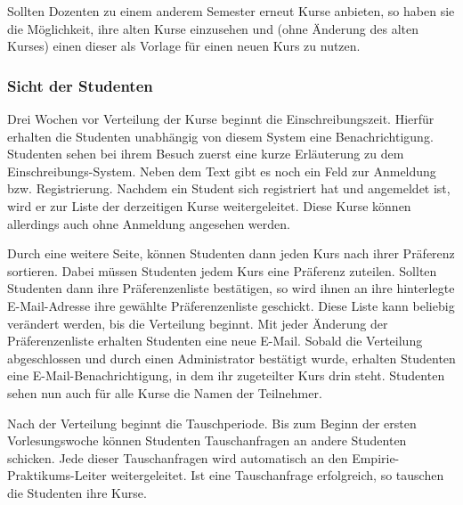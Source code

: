        Sollten Dozenten zu einem anderem Semester erneut Kurse anbieten, so haben sie die Möglichkeit, ihre alten Kurse einzusehen und (ohne Änderung des alten Kurses) einen dieser als Vorlage für einen neuen Kurs zu nutzen.

            
        \subsubsection{Sicht der Studenten}
        Drei Wochen vor Verteilung der Kurse beginnt die Einschreibungszeit. Hierfür erhalten die Studenten unabhängig von diesem System eine Benachrichtigung.
        Studenten sehen bei ihrem Besuch zuerst eine kurze Erläuterung zu dem Einschreibungs-System.
        Neben dem Text gibt es noch ein Feld zur Anmeldung bzw. Registrierung.
        Nachdem ein Student sich registriert hat und angemeldet ist, wird er zur Liste der derzeitigen Kurse weitergeleitet.
        Diese Kurse können allerdings auch ohne Anmeldung angesehen werden. %
        
        Durch eine weitere Seite, können Studenten dann jeden Kurs nach ihrer Präferenz sortieren. Dabei müssen Studenten jedem Kurs eine Präferenz zuteilen.
        Sollten Studenten dann ihre Präferenzenliste bestätigen, so wird ihnen an ihre hinterlegte E-Mail-Adresse ihre gewählte Präferenzenliste geschickt.
        Diese Liste kann beliebig verändert werden, bis die Verteilung beginnt.
        Mit jeder Änderung der Präferenzenliste erhalten Studenten eine neue E-Mail. %
        Sobald die Verteilung abgeschlossen und durch einen Administrator bestätigt wurde, erhalten Studenten eine E-Mail-Benachrichtigung, in dem ihr zugeteilter Kurs drin steht.
        Studenten sehen nun auch für alle Kurse die Namen der Teilnehmer.
        
        Nach der Verteilung beginnt die Tauschperiode.
        Bis zum Beginn der ersten Vorlesungswoche können Studenten Tauschanfragen an andere Studenten schicken.
        Jede dieser Tauschanfragen wird automatisch an den Empirie-Praktikums-Leiter weitergeleitet.
        Ist eine Tauschanfrage erfolgreich, so tauschen die Studenten ihre Kurse.

